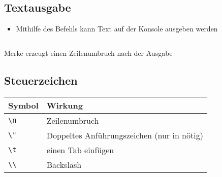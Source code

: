 \subsection{Textausgabe}
\begin{frame}
    \slidehead
    \begin{itemize}
        \item Mithilfe des Befehls  kann Text auf der Konsole ausgeben werden
    \end{itemize}
    \pause
    \begin{columns}
        \begin{column}{.4\textwidth}
        \end{column}%
        \begin{column}{.6\textwidth}
        \end{column}
    \end{columns}
    \vspace{0.25cm}
    \begin{block}{Merke}
         erzeugt einen Zeilenumbruch nach der Ausgabe
    \end{block}
\end{frame}

\subsection{Steuerzeichen}
\begin{frame}[fragile]
    \slidehead

    \begin{table}[htbp]
        \begin{tabular}{|l|l|}
            \hline
            \textbf{Symbol} & \textbf{Wirkung}                                               \\ \hline
            \verb+\n+       & Zeilenumbruch                                                  \\ \hline
            \verb+\"+       & Doppeltes Anführungszeichen  (nur in \kotlininline{" "} nötig) \\ \hline
            \verb+\t+       & einen Tab einfügen                                             \\ \hline
            \verb+\\+       & Backslash                                                      \\ \hline
        \end{tabular}
        \label{}
    \end{table}
    \pause
\end{frame}

